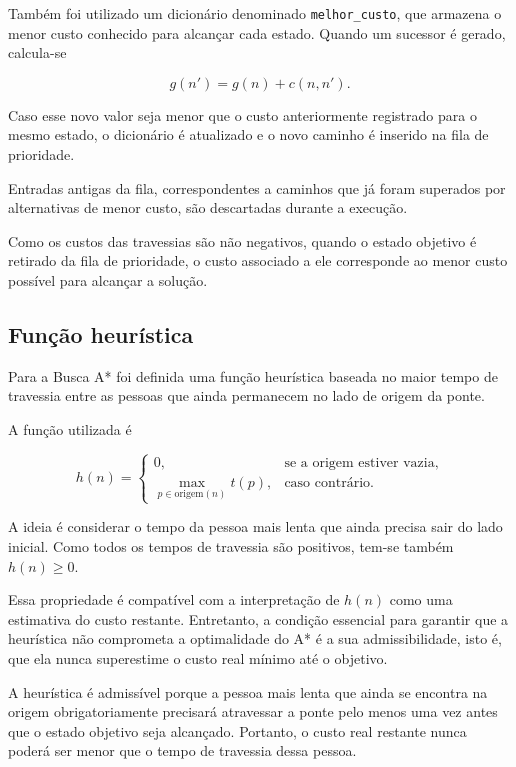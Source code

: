 Também foi utilizado um dicionário denominado \texttt{melhor\_custo}, que
armazena o menor custo conhecido para alcançar cada estado. Quando um sucessor
é gerado, calcula-se

\begin{equation}
	g(n') = g(n) + c(n,n').
\end{equation}

Caso esse novo valor seja menor que o custo anteriormente registrado para o
mesmo estado, o dicionário é atualizado e o novo caminho é inserido na fila de
prioridade.

Entradas antigas da fila, correspondentes a caminhos que já foram superados
por alternativas de menor custo, são descartadas durante a execução.

Como os custos das travessias são não negativos, quando o estado objetivo é
retirado da fila de prioridade, o custo associado a ele corresponde ao menor
custo possível para alcançar a solução.

\subsection{Função heurística}

Para a Busca A* foi definida uma função heurística baseada no maior tempo de
travessia entre as pessoas que ainda permanecem no lado de origem da ponte.

A função utilizada é

\begin{equation}
	h(n)=
	\begin{cases}
		0, & \text{se a origem estiver vazia}, \\[2mm]
		\displaystyle\max_{p\in \mathrm{origem}(n)} t(p),
		   & \text{caso contrário}.
	\end{cases}
\end{equation}

A ideia é considerar o tempo da pessoa mais lenta que ainda precisa sair do
lado inicial. Como todos os tempos de travessia são positivos, tem-se também
$h(n)\geq 0$.

Essa propriedade é compatível com a interpretação de $h(n)$ como uma
estimativa do custo restante. Entretanto, a condição essencial para garantir
que a heurística não comprometa a optimalidade do A* é a sua admissibilidade,
isto é, que ela nunca superestime o custo real mínimo até o objetivo.

A heurística é admissível porque a pessoa mais lenta que ainda se encontra na
origem obrigatoriamente precisará atravessar a ponte pelo menos uma vez antes
que o estado objetivo seja alcançado. Portanto, o custo real restante nunca
poderá ser menor que o tempo de travessia dessa pessoa.

